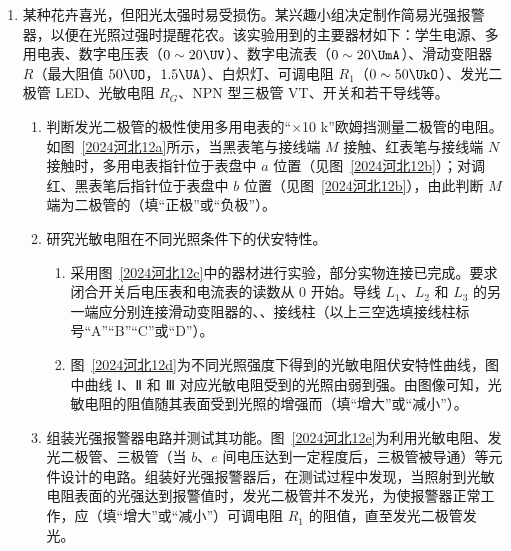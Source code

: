 \documentclass[\gkver]{gaokaozhenti}
\begin{document}
\begin{enumerate}
\item
某种花卉喜光，但阳光太强时易受损伤。某兴趣小组决定制作简易光强报警器，以便在光照过强时提醒花农。该实验用到的主要器材如下：学生电源、多用电表、数字电压表（$0\sim20 \UV$）、数字电流表（$0\sim20 \UmA$）、滑动变阻器 $R$（最大阻值 $50 \UO$，$1.5 \UA$）、白炽灯、可调电阻 $R_{1}$（$0\sim50 \UkO$）、发光二极管 LED、光敏电阻 $R_{G}$、NPN 型三极管 VT、开关和若干导线等。
\begin{enumerate}
	\item
	判断发光二极管的极性使用多用电表的“$\times$10 k”欧姆挡测量二极管的电阻。如图~\ref{2024河北12a}所示，当黑表笔与接线端 $M$ 接触、红表笔与接线端 $N$ 接触时，多用电表指针位于表盘中 $a$ 位置（见图~\ref{2024河北12b}）；对调红、黑表笔后指针位于表盘中 $b$ 位置（见图~\ref{2024河北12b}），由此判断 $M$ 端为二极管的（填“正极”或“负极”）。
	\item
	研究光敏电阻在不同光照条件下的伏安特性。
	\begin{enumerate}
		\item
		采用图~\ref{2024河北12c}中的器材进行实验，部分实物连接已完成。要求闭合开关后电压表和电流表的读数从 0 开始。导线 $L_{1}$、$L_{2}$ 和 $L_{3}$ 的另一端应分别连接滑动变阻器的、、接线柱（以上三空选填接线柱标号“A”“B”“C”或“D”）。
		\item
		图~\ref{2024河北12d}为不同光照强度下得到的光敏电阻伏安特性曲线，图中曲线 Ⅰ、Ⅱ 和 Ⅲ 对应光敏电阻受到的光照由弱到强。由图像可知，光敏电阻的阻值随其表面受到光照的增强而（填“增大”或“减小”）。
	\end{enumerate}
	\item
	组装光强报警器电路并测试其功能。图~\ref{2024河北12e}为利用光敏电阻、发光二极管、三极管（当 $b$、$e$ 间电压达到一定程度后，三极管被导通）等元件设计的电路。组装好光强报警器后，在测试过程中发现，当照射到光敏电阻表面的光强达到报警值时，发光二极管并不发光，为使报警器正常工作，应（填“增大”或“减小”）可调电阻 $R_{1}$ 的阻值，直至发光二极管发光。
\end{enumerate}



\end{enumerate}
\end{document}
